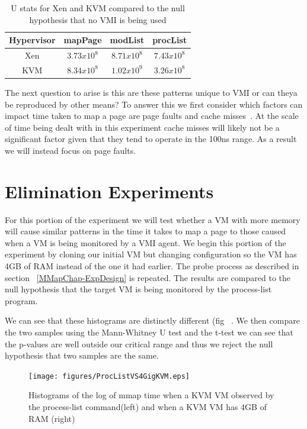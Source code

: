 	\begin{table}[p!]
		\centering
		\begin{tabular}{| c | c | c | c |}
			\hline
			Hypervisor & mapPage & modList & procList  \\ \hline
			Xen & $3.73x10^{8}$ & $8.71x10^{8}$ & $7.43x10^{8}$  \\  \hline
			KVM & $8.34x10^{8}$ & $1.02x10^{9}$ & $3.26x10^{8}$ \\  \hline
		\end{tabular}
		\label{MannWhitneyMMap1}
		\caption{U stats for Xen and KVM compared to the null hypothesis that no VMI is being used}
	\end{table}



The next question to arise is this are these patterns unique to VMI or can theya be reproduced by other means? To answer this we first consider which factors can impact time taken to map a page are page faults and cache misses~\cite{bryant_computer_2003}.  At the scale of time being dealt with in this experiment cache misses will likely not be a significant factor given that they tend to operate in the 100ns range. As a result we will instead focus on page faults. 

\section{Elimination Experiments}

For this portion of the experiment we will test whether a VM with more memory will cause similar patterns in the time it takes to map a page  to those caused when a VM is being monitored by a VMI agent. We begin this portion of the experiment by cloning our initial VM but changing configuration so the VM has 4GB of RAM instead of the one it had earlier. The probe process as described in section ~\ref{MMapChap-ExpDesign} is repeated. The results are compared to the null hypothesis that the target VM is being monitored by the process-list program. 


We can see that these histograms are distinctly different (fig ~\cite{KVMMMapVS4Gig}. We then compare the two samples using the Mann-Whitney U test and the t-test we can see that the p-values are well outside our critical range and thus we reject the null hypothesis that two samples are the same. 

	\begin{figure}[p!]\label{KVMMMapVS4Gig}
	  \centering
	  \texttt{[image: figures/ProcListVS4GigKVM.eps]}
	  \caption{Histograms of the log of mmap time when a KVM VM observed by the process-list command(left) and when a KVM VM has 4GB of RAM (right)} 
	\end{figure}

